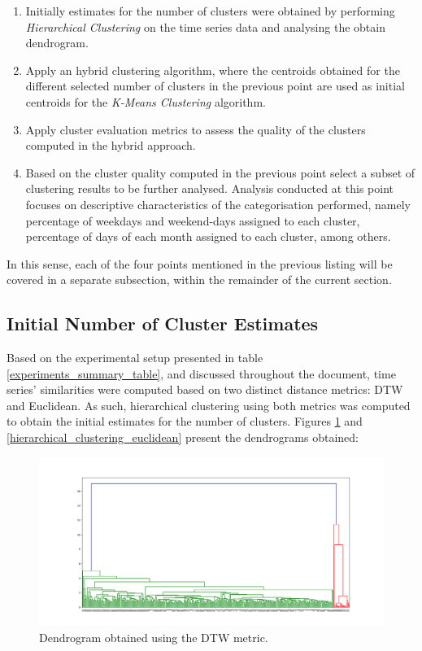 \documentclass[9pt,journal,compsoc]{IEEEtran}
\begin{document}
\begin{enumerate}
	\item Initially estimates for the number of clusters were obtained by performing \emph{Hierarchical Clustering} on the time series data and analysing the obtain dendrogram.
	
	\item Apply an hybrid clustering algorithm, where the centroids obtained for the different selected number of clusters in the previous point are used as initial centroids for the \emph{K-Means Clustering} algorithm.
	
	\item Apply cluster evaluation metrics to assess the quality of the clusters computed in the hybrid approach.
	
	\item Based on the cluster quality computed in the previous point select a subset of clustering results to be further analysed. Analysis conducted at this point focuses on descriptive characteristics of the categorisation performed, namely percentage of weekdays and weekend-days assigned to each cluster, percentage of days of each month assigned to each cluster, among others.
\end{enumerate}

In this sense, each of the four points mentioned in the previous listing will be covered in a separate subsection, within the remainder of the current section.

\subsection{Initial Number of Cluster Estimates}
\label{initial_number_clusters}

Based on the experimental setup presented in table \ref{experiments_summary_table}, and discussed throughout the document, time series' similarities were computed based on two distinct distance metrics: DTW and Euclidean. As such, hierarchical clustering using both metrics was computed to obtain the initial estimates for the number of clusters. Figures \ref{hierarchical_clustering_dtw} and \ref{hierarchical_clustering_euclidean} present the dendrograms obtained:

\begin{figure}[ht]
	\centering
	\includegraphics[scale=0.2]{images/Hierarchical_Clustering_DTW.png}
	\caption{Dendrogram obtained using the DTW metric.}
	\label{hierarchical_clustering_dtw}
\end{figure}
\end{document}
